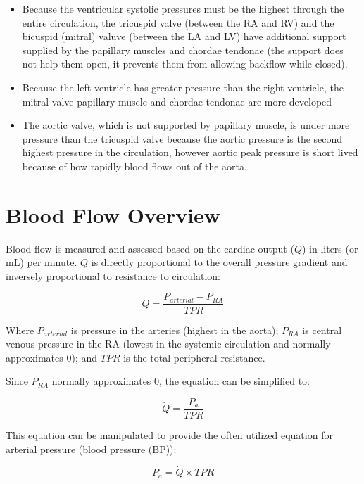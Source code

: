 \begin{itemize}
    \item Because the ventricular systolic pressures must be the highest through the entire circulation, the tricuspid valve (between the RA and RV) and the bicuspid (mitral) valuve (between the LA and LV) have additional support supplied by the papillary muscles and chordae tendonae (the support does not help them open, it prevents them from allowing backflow while closed).
    \item Because the left ventricle has greater pressure than the right ventricle, the mitral valve papillary muscle and chordae tendonae are more developed
    \item The aortic valve, which is not supported by papillary muscle, is under more pressure than the tricuspid valve because the aortic pressure is the second highest pressure in the circulation, however aortic peak pressure is short lived because of how rapidly blood flows out of the aorta.
\end{itemize}

\section{Blood Flow Overview}

Blood flow is measured and assessed based on the cardiac output ($\dot{Q}$) in liters (or mL) per minute. $\dot{Q}$ is directly proportional to the overall pressure gradient and inversely proportional to resistance to circulation:

\begin{equation}
    \dot{Q} = \frac{P_{arterial} - P_{RA}}{TPR}
    \label{Q}
\end{equation}

Where $P_{arterial}$ is pressure in the arteries (highest in the aorta); $P_{RA}$ is central venous pressure in the RA (lowest in the systemic circulation and normally approximates 0); and $TPR$ is the total peripheral resistance.

Since $P_{RA}$ normally approximates 0, the equation can be simplified to:

\begin{equation}
    \dot{Q} = \frac{P_{a}}{TPR}
    \label{Q_simplified}
\end{equation}

This equation can be manipulated to provide the often utilized equation for arterial pressure (blood pressure (BP)):

\begin{equation}
    P_{a} = \dot{Q} \times TPR
    \label{BP}
\end{equation}

